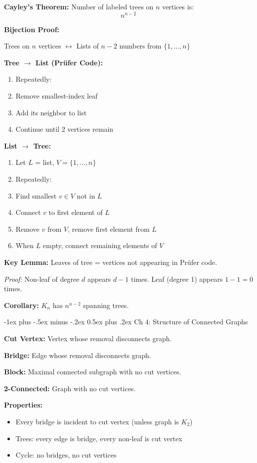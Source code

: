 \documentclass[10pt,landscape]{article}
\makeatletter
\renewcommand{\section}{\@startsection{section}{1}{0mm}%
                                {-1ex plus -.5ex minus -.2ex}%
                                {0.5ex plus .2ex}%
                                {\normalfont\large\bfseries}}
\makeatother
\begin{document}
\begin{multicols}{3}
\textbf{Cayley's Theorem:} Number of labeled trees on $n$ vertices is:
$$n^{n-2}$$

\textbf{Bijection Proof:}

Trees on $n$ vertices $\longleftrightarrow$ Lists of $n-2$ numbers from $\{1, \ldots, n\}$

\textbf{Tree $\to$ List (Prüfer Code):}
\begin{enumerate}
\item Repeatedly:
\item[] Remove smallest-index leaf
\item[] Add its neighbor to list
\item Continue until 2 vertices remain
\end{enumerate}

\textbf{List $\to$ Tree:}
\begin{enumerate}
\item Let $L$ = list, $V = \{1, \ldots, n\}$
\item Repeatedly:
\item[] Find smallest $v \in V$ not in $L$
\item[] Connect $v$ to first element of $L$
\item[] Remove $v$ from $V$, remove first element from $L$
\item When $L$ empty, connect remaining elements of $V$
\end{enumerate}

\textbf{Key Lemma:} Leaves of tree = vertices not appearing in Prüfer code.

\textit{Proof:} Non-leaf of degree $d$ appears $d-1$ times. Leaf (degree 1) appears $1-1 = 0$ times.

\textbf{Corollary:} $K_n$ has $n^{n-2}$ spanning trees.

\section{Ch 4: Structure of Connected Graphs}

\textbf{Cut Vertex:} Vertex whose removal disconnects graph.

\textbf{Bridge:} Edge whose removal disconnects graph.

\textbf{Block:} Maximal connected subgraph with no cut vertices.

\textbf{2-Connected:} Graph with no cut vertices.

\textbf{Properties:}
\begin{itemize}
\item Every bridge is incident to cut vertex (unless graph is $K_2$)
\item Trees: every edge is bridge, every non-leaf is cut vertex
\item Cycle: no bridges, no cut vertices
\end{itemize}


\end{multicols}
\end{document}
